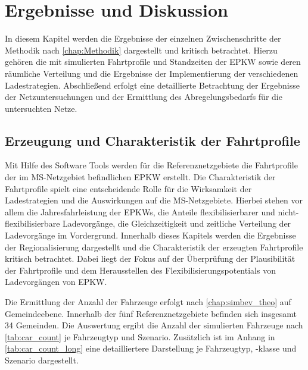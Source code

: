 \section{Ergebnisse und Diskussion}\label{chap:results}

In diesem Kapitel werden die Ergebnisse der einzelnen Zwischenschritte der Methodik nach \autoref{chap:Methodik} dargestellt und kritisch betrachtet.
Hierzu gehören die mit  simulierten Fahrtprofile und Standzeiten der \gls{EPKW} sowie deren räumliche Verteilung und die Ergebnisse der Implementierung der verschiedenen Ladestrategien.
Abschließend erfolgt eine detaillierte Betrachtung der Ergebnisse der Netzuntersuchungen und der Ermittlung des Abregelungsbedarfs für die untersuchten Netze.


\subsection{Erzeugung und Charakteristik der Fahrtprofile}

Mit Hilfe des Software Tools  werden für die Referenznetzgebiete die Fahrtprofile der im \gls{MS}-Netzgebiet befindlichen \gls{EPKW} erstellt.
Die Charakteristik der Fahrtprofile spielt eine entscheidende Rolle für die Wirksamkeit der Ladestrategien und die Auswirkungen auf die \gls{MS}-Netzgebiete.
Hierbei stehen vor allem die Jahresfahrleistung der \glspl{EPKW}, die Anteile flexibilisierbarer und nicht-flexibilisierbare Ladevorgänge, die Gleichzeitigkeit und zeitliche Verteilung der Ladevorgänge im Vordergrund.
Innerhalb dieses Kapitels werden die Ergebnisse der Regionalisierung dargestellt und die Charakteristik der erzeugten Fahrtprofile kritisch betrachtet.
Dabei liegt der Fokus auf der Überprüfung der Plausibilität der Fahrtprofile und dem Herausstellen des Flexibilisierungspotentials von Ladevorgängen von \gls{EPKW}.\medskip

Die Ermittlung der Anzahl der Fahrzeuge erfolgt nach \autoref{chap:simbev_theo} auf Gemeindeebene.
Innerhalb der fünf Referenznetzgebiete befinden sich insgesamt \num{34} Gemeinden.
Die Auswertung ergibt die Anzahl der simulierten Fahrzeuge nach \autoref{tab:car_count} je Fahrzeugtyp und Szenario.
Zusätzlich ist im Anhang in \autoref{tab:car_count_long} eine detailliertere Darstellung je Fahrzeugtyp, -klasse und Szenario dargestellt.



